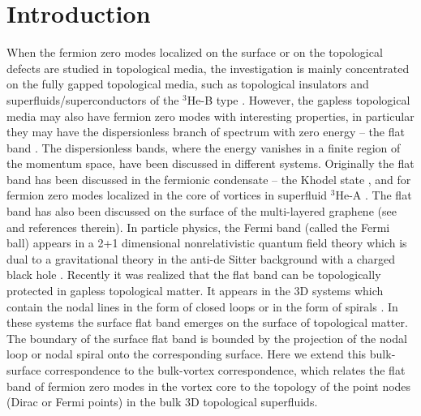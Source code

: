 \section{Introduction}
When the fermion zero modes localized on the surface or on the topological defects are studied in topological media, the investigation is mainly concentrated on the fully gapped topological media, such as topological insulators and superfluids/superconductors of the $^3$He-B type \cite{Fu,Qi,Fu2}. However, the gapless topological media may also have fermion zero modes with interesting properties, in particular they may have the dispersionless branch of spectrum with zero energy -- the flat band \cite{Fu2,Fu3}.
The dispersionless bands, where the energy vanishes in a finite region of the momentum space, have been discussed in different systems. Originally the flat band has been discussed in the fermionic condensate -- the Khodel state \cite{Khodel,Volovik,Volovik2,Volovik3}, and for fermion zero modes localized in the core of vortices in superfluid $^3$He-A \cite{Volovik4,Volovik5,Volovik6}. The flat band has also been discussed on the surface of the multi-layered graphene (see \cite{Volovik7,Volovik8} and references therein). In particle physics, the Fermi band (called the Fermi ball) appears in a 2+1 dimensional nonrelativistic quantum field theory which is dual to a gravitational theory in the anti-de Sitter background with a charged black hole \cite{Volovik8}.
Recently it was realized that the flat band can be topologically protected in gapless topological matter. It appears in the 3D systems which contain the nodal lines in the form of closed loops \cite{Volovik3} or in the form of spirals \cite{Volovik4}. In these systems the surface flat band emerges on the surface of topological matter. The boundary of the surface flat band is bounded by the projection of the nodal loop or nodal spiral onto the corresponding surface. Here we extend this bulk-surface correspondence to the bulk-vortex correspondence, which relates the flat band of fermion zero modes in the vortex core to the topology of the point nodes (Dirac or Fermi points) in the bulk 3D topological superfluids.
